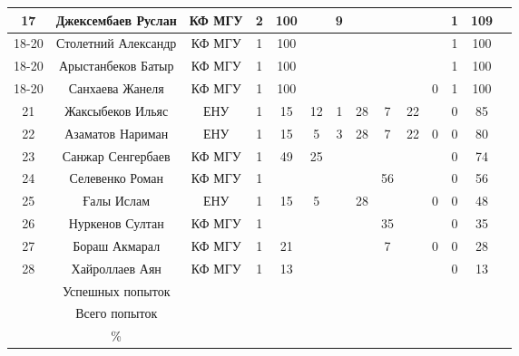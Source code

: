 \documentclass[10pt, a4paper, landscape]{article}
\begin{document}
\begin{center}
\begin{longtable}{|c|c|c|c|*{7}{c|}c|c|c|}
\hline
17 & Джексембаев Руслан & КФ МГУ & 2 & 100 &   & 9 &   &   &   &   & 1 & 109 & \\
\hline
18-20 & Столетний Александр & КФ МГУ & 1 & 100 &   &   &   &   &   &   & 1 & 100 & \\
\hline
18-20 & Арыстанбеков Батыр & КФ МГУ & 1 & 100 &   &   &   &   &   &   & 1 & 100 & \\
\hline
18-20 & Санхаева Жанеля & КФ МГУ & 1 & 100 &   &   &   &   &   & 0 & 1 & 100 & \\
\hline
21 & Жаксыбеков Ильяс & ЕНУ & 1 & 15 & 12 & 1 & 28 & 7 & 22 &   & 0 & 85 & \\
\hline
22 & Азаматов Нариман & ЕНУ & 1 & 15 & 5 & 3 & 28 & 7 & 22 & 0 & 0 & 80 & \\
\hline
23 & Санжар Сенгербаев & КФ МГУ & 1 & 49 & 25 &   &   &   &   &   & 0 & 74 & \\
\hline
24 & Селевенко Роман & КФ МГУ & 1 &   &   &   &   & 56 &   &   & 0 & 56 & \\
\hline
25 & Ғалы Ислам & ЕНУ & 1 & 15 & 5 &   & 28 &   &   & 0 & 0 & 48 & \\
\hline
26 & Нуркенов Султан & КФ МГУ & 1 &   &   &   &   & 35 &   &   & 0 & 35 & \\
\hline
27 & Бораш Акмарал & КФ МГУ & 1 & 21 &   &   &   & 7 &   & 0 & 0 & 28 & \\
\hline
28 & Хайроллаев Аян & КФ МГУ & 1 & 13 &   &   &   &   &   &   & 0 & 13 & \\
\hline
  & Успешных попыток & & &  &  &  &  &  & &  &  &  & \\
\hline
  & Всего попыток & & & &  &  &  &  &  &  &  &  & \\
\hline
  & \% & & &  &  &  &  &  &  &  &  &   & \\
\hline
\end{longtable}
\end{center}

\renewcommand{\arraystretch}{1}
\end{document}
